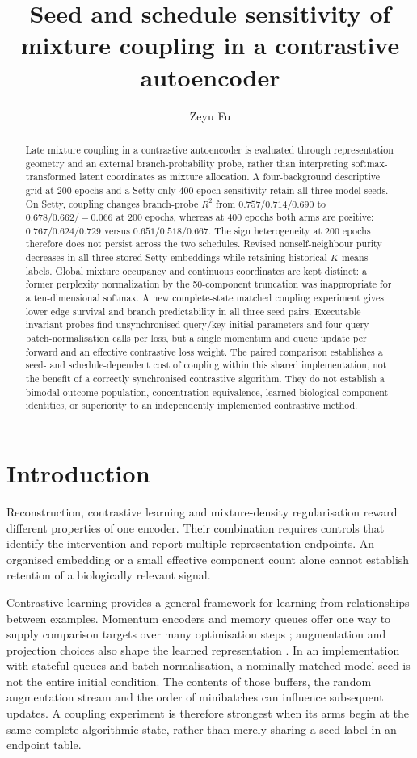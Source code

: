 \documentclass[11pt]{article}
\title{\textbf{Seed and schedule sensitivity of mixture coupling in a contrastive autoencoder}}
\author[1]{Zeyu Fu}
\affil[1]{State Key Laboratory of Trauma and Chemical Poisoning, Institute of Combined Injury,
Chongqing Engineering Research Center for Nanomedicine, College of Preventive Medicine,
Army Medical University, Chongqing, China\\
\texttt{fuzeyu09@gmail.com}}
\date{}
\begin{document}
\maketitle
\begin{abstract}
Late mixture coupling in a contrastive autoencoder is evaluated through representation geometry and an external branch-probability probe, rather than interpreting softmax-transformed latent coordinates as mixture allocation. A four-background descriptive grid at 200 epochs and a Setty-only 400-epoch sensitivity retain all three model seeds. On Setty, coupling changes branch-probe $R^2$ from $0.757/0.714/0.690$ to $0.678/0.662/-0.066$ at 200 epochs, whereas at 400 epochs both arms are positive: $0.767/0.624/0.729$ versus $0.651/0.518/0.667$. The sign heterogeneity at 200 epochs therefore does not persist across the two schedules. Revised nonself-neighbour purity decreases in all three stored Setty embeddings while retaining historical $K$-means labels. Global mixture occupancy and continuous coordinates are kept distinct: a former perplexity normalization by the 50-component truncation was inappropriate for a ten-dimensional softmax. A new complete-state matched coupling experiment gives lower edge survival and branch predictability in all three seed pairs. Executable invariant probes find unsynchronised query/key initial parameters and four query batch-normalisation calls per loss, but a single momentum and queue update per forward and an effective contrastive loss weight. The paired comparison establishes a seed- and schedule-dependent cost of coupling within this shared implementation, not the benefit of a correctly synchronised contrastive algorithm. They do not establish a bimodal outcome population, concentration equivalence, learned biological component identities, or superiority to an independently implemented contrastive method.
\end{abstract}

\section{Introduction}
Reconstruction, contrastive learning and mixture-density regularisation reward different properties of one encoder. Their combination requires controls that identify the intervention and report multiple representation endpoints. An organised embedding or a small effective component count alone cannot establish retention of a biologically relevant signal.

Contrastive learning provides a general framework for learning from relationships between examples. Momentum encoders and memory queues offer one way to supply comparison targets over many optimisation steps \cite{he2020momentum}; augmentation and projection choices also shape the learned representation \cite{chen2020simple}. In an implementation with stateful queues and batch normalisation, a nominally matched model seed is not the entire initial condition. The contents of those buffers, the random augmentation stream and the order of minibatches can influence subsequent updates. A coupling experiment is therefore strongest when its arms begin at the same complete algorithmic state, rather than merely sharing a seed label in an endpoint table.
\end{document}
